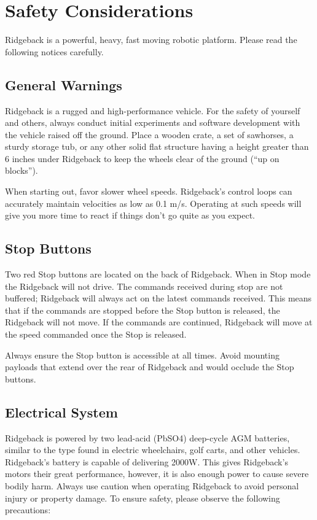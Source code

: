 \documentclass[]{clearpath-latex/clearpath-manual}
\begin{document}
\section{Safety Considerations}

Ridgeback is a powerful, heavy, fast moving robotic platform. Please read the following notices carefully.

\subsection{General Warnings}

Ridgeback is a rugged and high-performance vehicle. For the safety of yourself and others, always conduct initial experiments and software development with the vehicle raised off the ground. Place a wooden crate, a set of sawhorses, a sturdy storage tub, or any other solid flat structure having a height greater than 6 inches under Ridgeback to keep the wheels clear of the ground (“up on blocks”).

When starting out, favor slower wheel speeds. Ridgeback's control loops can accurately maintain velocities as low as 0.1 m/s. Operating at such speeds will give you more time to react if things don’t go quite as you expect.

\subsection{Stop Buttons}

Two red Stop buttons are located on the back of Ridgeback. When in Stop mode the Ridgeback will not drive. The commands received during stop are not buffered; Ridgeback will always act on the latest commands received. This means that if the commands are stopped before the Stop button is released, the Ridgeback will not move. If the commands are continued, Ridgeback will move at the speed commanded once the Stop is released.

Always ensure the Stop button is accessible at all times. Avoid mounting payloads that extend over the rear of Ridgeback and would occlude the Stop buttons.

\subsection{Electrical System}

Ridgeback is powered by two lead-acid (PbSO4) deep-cycle AGM batteries, similar to the type found in electric wheelchairs, golf carts, and other vehicles. Ridgeback's battery is capable of delivering 2000W. This gives Ridgeback's motors their great performance, however, it is also enough power to cause severe bodily harm. Always use caution when operating Ridgeback to avoid personal injury or property damage.  To ensure safety, please observe the following precautions:
\end{document}
